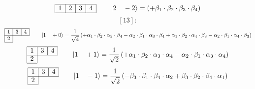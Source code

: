 \documentclass[fleqn]{article}%
\begin{document}
\vspace{0.25cm}%
\begin{dmath*}\begin{array}{|c|c|c|c|} \hline 1 & 2 & 3 & 4\\ \cline{1-4} \end{array} \qquad \ket{ 2 \quad  -2 } = \left( + \beta_{1} \cdot \beta_{2} \cdot \beta_{3} \cdot \beta_{4}\right) \end{dmath*}%
\vspace{0.25cm}%
\vspace{0.25cm}%
\vspace{0.25cm}%
\begin{dmath*}\left[13\right]:\end{dmath*}%
\vspace{0.25cm}%
\begin{dmath*}\begin{array}{|c|c|c|} \hline 1 & 3 & 4\\ \cline{1-3} 2\\ \cline{1-1} \end{array} \qquad \ket{ 1 \quad  +0 } = \frac{1}{\sqrt{4}} \left( + \alpha_{1} \cdot \beta_{2} \cdot \alpha_{3} \cdot \beta_{4}  - \alpha_{2} \cdot \beta_{1} \cdot \alpha_{3} \cdot \beta_{4}  + \alpha_{1} \cdot \beta_{2} \cdot \alpha_{4} \cdot \beta_{3}  - \alpha_{2} \cdot \beta_{1} \cdot \alpha_{4} \cdot \beta_{3}\right) \end{dmath*}%
\vspace{0.25cm}%
\begin{dmath*}\begin{array}{|c|c|c|} \hline 1 & 3 & 4\\ \cline{1-3} 2\\ \cline{1-1} \end{array} \qquad \ket{ 1 \quad  +1 } = \frac{1}{\sqrt{2}} \left( + \alpha_{1} \cdot \beta_{2} \cdot \alpha_{3} \cdot \alpha_{4}  - \alpha_{2} \cdot \beta_{1} \cdot \alpha_{3} \cdot \alpha_{4}\right) \end{dmath*}%
\vspace{0.25cm}%
\begin{dmath*}\begin{array}{|c|c|c|} \hline 1 & 3 & 4\\ \cline{1-3} 2\\ \cline{1-1} \end{array} \qquad \ket{ 1 \quad  -1 } = \frac{1}{\sqrt{2}} \left( - \beta_{3} \cdot \beta_{1} \cdot \beta_{4} \cdot \alpha_{2}  + \beta_{3} \cdot \beta_{2} \cdot \beta_{4} \cdot \alpha_{1}\right) \end{dmath*}%
\end{document}
